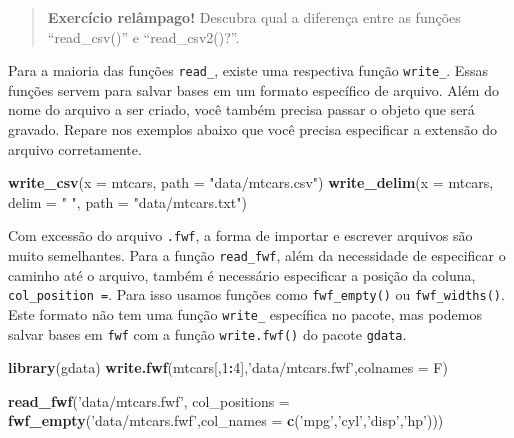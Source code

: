 \documentclass[
]{book}
\newenvironment{Shaded}{\begin{snugshade}}{\end{snugshade}}
\newcommand{\DataTypeTok}[1]{\textcolor[rgb]{0.13,0.29,0.53}{#1}}
\newcommand{\DecValTok}[1]{\textcolor[rgb]{0.00,0.00,0.81}{#1}}
\newcommand{\KeywordTok}[1]{\textcolor[rgb]{0.13,0.29,0.53}{\textbf{#1}}}
\newcommand{\NormalTok}[1]{#1}
\newcommand{\OperatorTok}[1]{\textcolor[rgb]{0.81,0.36,0.00}{\textbf{#1}}}
\newcommand{\StringTok}[1]{\textcolor[rgb]{0.31,0.60,0.02}{#1}}
\begin{document}
\begin{quote}
\textbf{Exercício relâmpago!} Descubra qual a diferença entre as funções ``read\_csv()'' e ``read\_csv2()?''.
\end{quote}

Para a maioria das funções \texttt{read\_}, existe uma respectiva função \texttt{write\_}. Essas funções servem para salvar bases em um formato específico de arquivo. Além do nome do arquivo a ser criado, você também precisa passar o objeto que será gravado. Repare nos exemplos abaixo que você precisa especificar a extensão do arquivo corretamente.

\begin{Shaded}
\begin{Highlighting}[]
\KeywordTok{write_csv}\NormalTok{(}\DataTypeTok{x =}\NormalTok{ mtcars, }\DataTypeTok{path =} \StringTok{"data/mtcars.csv"}\NormalTok{)}
\KeywordTok{write_delim}\NormalTok{(}\DataTypeTok{x =}\NormalTok{ mtcars, }\DataTypeTok{delim =} \StringTok{" "}\NormalTok{, }\DataTypeTok{path =} \StringTok{"data/mtcars.txt"}\NormalTok{)}
\end{Highlighting}
\end{Shaded}

Com excessão do arquivo \texttt{.fwf}, a forma de importar e escrever arquivos são muito semelhantes. Para a função \texttt{read\_fwf}, além da necessidade de especificar o caminho até o arquivo, também é necessário especificar a posição da coluna, \texttt{col\_position\ =}. Para isso usamos funções como \texttt{fwf\_empty()} ou \texttt{fwf\_widths()}. Este formato não tem uma função \texttt{write\_} específica no pacote, mas podemos salvar bases em \texttt{fwf} com a função \texttt{write.fwf()} do pacote \texttt{gdata}.

\begin{Shaded}
\begin{Highlighting}[]
\KeywordTok{library}\NormalTok{(gdata)}
\KeywordTok{write.fwf}\NormalTok{(mtcars[,}\DecValTok{1}\OperatorTok{:}\DecValTok{4}\NormalTok{],}\StringTok{'data/mtcars.fwf'}\NormalTok{,}\DataTypeTok{colnames =}\NormalTok{ F)}

\KeywordTok{read_fwf}\NormalTok{(}\StringTok{'data/mtcars.fwf'}\NormalTok{, }\DataTypeTok{col_positions =} \KeywordTok{fwf_empty}\NormalTok{(}\StringTok{'data/mtcars.fwf'}\NormalTok{,}\DataTypeTok{col_names =} \KeywordTok{c}\NormalTok{(}\StringTok{'mpg'}\NormalTok{,}\StringTok{'cyl'}\NormalTok{,}\StringTok{'disp'}\NormalTok{,}\StringTok{'hp'}\NormalTok{)))}
\end{Highlighting}
\end{Shaded}
\end{document}
